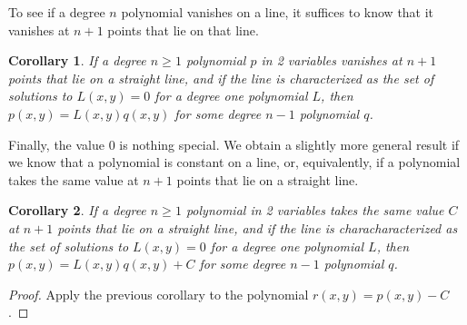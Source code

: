 \documentclass{article}
\theoremstyle{plain}
\newtheorem{corollary}{Corollary}
\theoremstyle{definition}
\theoremstyle{remark}
\begin{document}
To see if a degree $n$ polynomial vanishes on a line, it suffices to know that it vanishes at $n+1$ points that lie on that line.
\begin{corollary}
	If a degree $n \geq 1$ polynomial $p$ in 2 variables vanishes at $n+1$ points that lie on a straight line, and if the line is characterized as the set of solutions to $L(x,y) = 0$ for a degree one polynomial $L$, then $p(x,y) = L(x,y)q(x,y)$ for some degree $n-1$ polynomial $q$.
\end{corollary}

Finally, the value $0$ is nothing special.
We obtain a slightly more general result if we know that a polynomial is constant on a line, or, equivalently, if a polynomial takes the same value at $n+1$ points that lie on a straight line.

\begin{corollary}
	If a degree $n \geq 1$ polynomial in 2 variables takes the same value $C$ at $n+1$ points that lie on a straight line, and if the line is characharacterized as the set of solutions to $L(x,y) = 0$ for a degree one polynomial $L$, then $p(x,y) = L(x,y)q(x,y) + C$ for some degree $n-1$ polynomial $q$.
\end{corollary}
\begin{proof}
	Apply the previous corollary to the polynomial $r(x,y) = p(x,y) - C$.
\end{proof}
\end{document}
